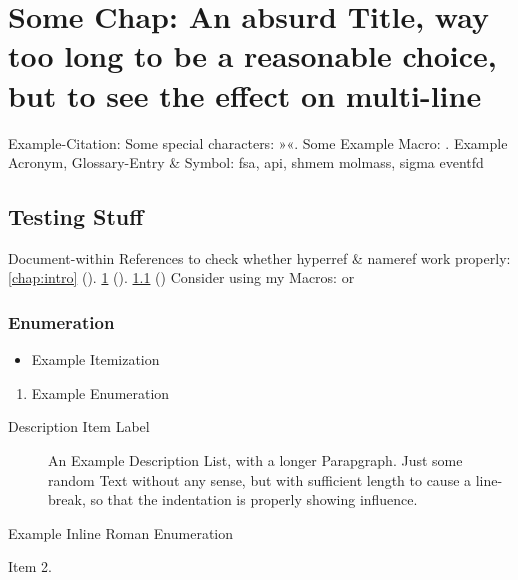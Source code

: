 
\chapter[Alternative "Some Chap" Title. Shorter for page-heading]{Some Chap: An absurd Title, way too long to be a reasonable choice, but to see the effect on multi-line}
\label{chap:chapter1}

Example-Citation:
\cite{DenKr_denkrement1_indeco}
\nl%
Some special characters:
»«.
\nl%
Some Example Macro:
.
\nl%
Example Acronym, Glossary-Entry \& Symbol:\nl
\gls{fsa}, \gls{api}, \gls{shmem}\nl
\gls{molmass}, \gls{sigma}\nl
\gls{eventfd}


\section{Testing Stuff}
\label{sec:testing}

Document-within References to check whether hyperref \& nameref work properly:\nl%
\ref{chap:intro} (). \ref{chap:chapter1}  (). \ref{sec:testing} ()\nl%
Consider using my Macros:\nl
{} or 



\subsection{Enumeration}

\begin{itemize}
\item%
    Example Itemization
\end{itemize}
\begin{enumerate}
\item%
    Example Enumeration
\end{enumerate}
\begin{description}
\item[Description Item Label]%
    An Example Description List, with a longer Parapgraph. Just some random Text without any sense, but with sufficient length to cause a line-break, so that the indentation is properly showing influence.
\end{description}
\begin{enuminlrom}
\item%
    Example Inline Roman Enumeration
\item%
    Item 2.
\end{enuminlrom}



